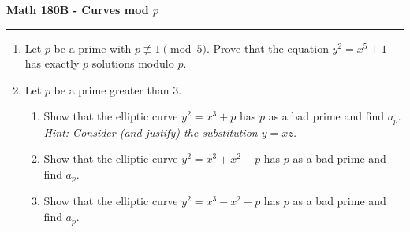 \documentclass[11pt,letterpaper]{report}
\begin{document}
\begin{center}
{\bf \Large Math 180B - Curves mod $p$}
\vspace{0.2cm}
\hrule
\end{center}

\begin{enumerate}
	\item Let $p$ be a prime with $p\not\equiv 1\pmod{5}$. Prove that the equation $y^2 = x^5+1$ has exactly $p$ solutions modulo $p$.

	\vfill

	\item Let $p$ be a prime greater than 3.
	\begin{enumerate}
		\item Show that the elliptic curve $y^2 = x^3 + p$ has $p$ as a bad prime and find $a_p$. \textit{Hint: Consider (and justify) the substitution $y = xz$.}
		\item Show that the elliptic curve $y^2 = x^3 + x^2 + p$ has $p$ as a bad prime and find $a_p$.
		\item Show that the elliptic curve $y^2 = x^3-x^2+p$ has $p$ as a bad prime and find $a_p$.
	\end{enumerate}

	\vfill

\end{enumerate}
\end{document}
